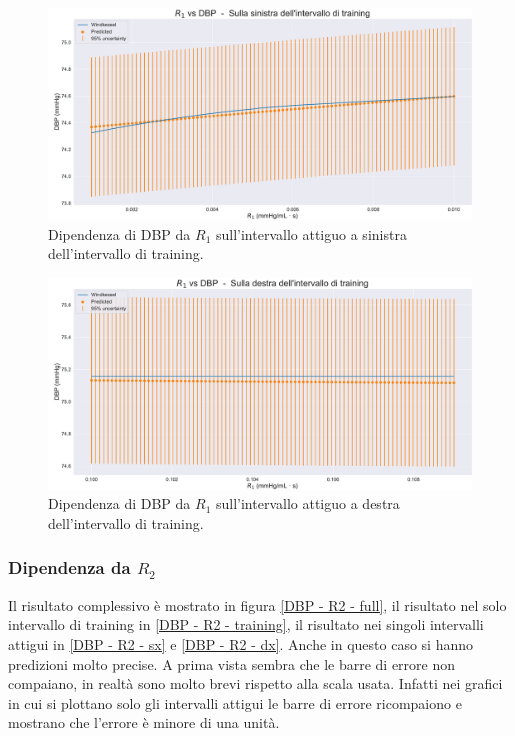 \begin{figure}
    \centering
    \includegraphics[width=1\textwidth]{images/Training (risultati)/DBP/DBP - R1 - sx.pdf}
    \caption{Dipendenza di DBP da $R_1$ sull'intervallo attiguo a sinistra dell'intervallo di training.}
    \label{DBP - R1 - sx}
\end{figure}



\begin{figure}
    \centering
    \includegraphics[width=1\textwidth]{images/Training (risultati)/DBP/DBP - R1 - dx.pdf}
    \caption{Dipendenza di DBP da $R_1$ sull'intervallo attiguo a destra dell'intervallo di training.}
    \label{DBP - R1 - dx}
\end{figure}



\newpage
\subsubsection{Dipendenza da $R_2$}
Il risultato complessivo è mostrato in figura \ref{DBP - R2 - full}, il risultato nel solo intervallo di training in \ref{DBP - R2 - training}, il risultato nei singoli intervalli attigui in \ref{DBP - R2 - sx} e \ref{DBP - R2 - dx}. Anche in questo caso si hanno predizioni molto precise. A prima vista sembra che le barre di errore non compaiano, in realtà sono molto brevi rispetto alla scala usata. Infatti nei grafici in cui si plottano solo gli intervalli attigui le barre di errore ricompaiono e mostrano che l'errore è minore di una unità.

